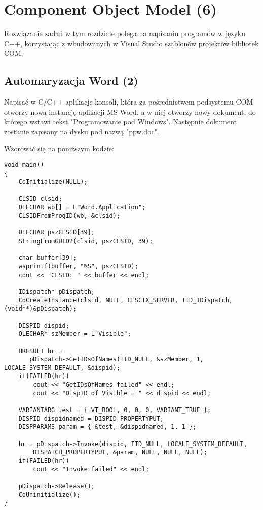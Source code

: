 ﻿\section{Component Object Model (6)}

Rozwiązanie zadań w tym rozdziale polega na napisaniu programów w
języku C++, korzystając z wbudowanych w Visual Studio szablonów projektów bibliotek COM.

\subsection {Automaryzacja Word (2)}

      Napisać w C/C++ aplikację konsoli, która za pośrednictwem podsystemu COM otworzy nową instancję aplikacji MS Word, a w niej otworzy
\label{com_client}	  
	  nowy dokument,
      do którego wstawi tekst "Programowanie pod Windows". Następnie dokument zostanie zapisany na dysku pod nazwą "ppw.doc".
      
	  Wzorować się na poniższym kodzie:
\begin{scriptsize}	  
\begin{verbatim}
void main()
{
	CoInitialize(NULL);

	CLSID clsid;
	OLECHAR wb[] = L"Word.Application";
	CLSIDFromProgID(wb, &clsid);

	OLECHAR pszCLSID[39];
	StringFromGUID2(clsid, pszCLSID, 39);
	
	char buffer[39];
	wsprintf(buffer, "%S", pszCLSID);
	cout << "CLSID: " << buffer << endl;

	IDispatch* pDispatch;
	CoCreateInstance(clsid, NULL, CLSCTX_SERVER, IID_IDispatch, (void**)&pDispatch);

	DISPID dispid;
	OLECHAR* szMember = L"Visible";

	HRESULT hr = 
	   pDispatch->GetIDsOfNames(IID_NULL, &szMember, 1, LOCALE_SYSTEM_DEFAULT, &dispid);
	if(FAILED(hr))
	    cout << "GetIDsOfNames failed" << endl;
	    cout << "DispID of Visible = " << dispid << endl;

	VARIANTARG test = { VT_BOOL, 0, 0, 0, VARIANT_TRUE };
	DISPID dispidnamed = DISPID_PROPERTYPUT;
	DISPPARAMS param = { &test, &dispidnamed, 1, 1 };

	hr = pDispatch->Invoke(dispid, IID_NULL, LOCALE_SYSTEM_DEFAULT,
		DISPATCH_PROPERTYPUT, &param, NULL, NULL, NULL);
	if(FAILED(hr))
		cout << "Invoke failed" << endl;

	pDispatch->Release();
	CoUninitialize();
}
\end{verbatim}
\end{scriptsize}
	  
